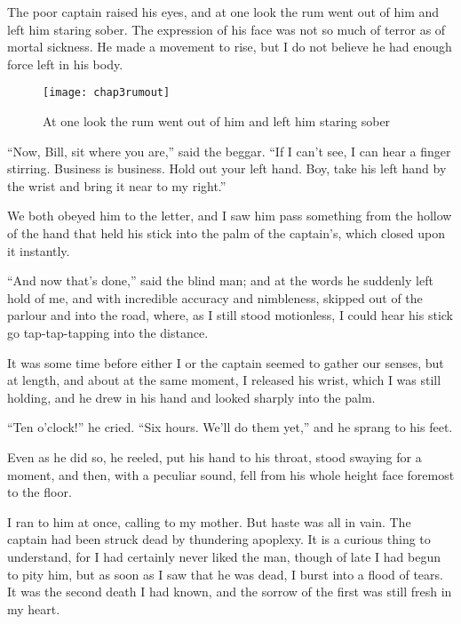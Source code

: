  

The poor captain raised his eyes, and at one look the rum went out of him and left him staring sober. The expression of his face was not so much of terror as of mortal sickness. He made a movement to rise, but I do not believe he had enough force left in his body.

\begin{sidewaysfigure}
\texttt{[image: chap3rumout]}%
\caption[The rum went out of him]{At one look the rum went out of him and left him staring sober}
\end{sidewaysfigure}

\enquote{Now, Bill, sit where you are,} said the beggar. \enquote{If I can’t see, I can hear a finger stirring. Business is business. Hold out your left hand. Boy, take his left hand by the wrist and bring it near to my right.}

We both obeyed him to the letter, and I saw him pass something from the hollow of the hand that held his stick into the palm of the captain’s, which closed upon it instantly.

\enquote{And now that’s done,} said the blind man; and at the words he suddenly left hold of me, and with incredible accuracy and nimbleness, skipped out of the parlour and into the road, where, as I still stood motionless, I could hear his stick go tap-tap-tapping into the distance.

It was some time before either I or the captain seemed to gather our senses, but at length, and about at the same moment, I released his wrist, which I was still holding, and he drew in his hand and looked sharply into the palm.

\enquote{Ten o’clock!} he cried. \enquote{Six hours. We’ll do them yet,} and he sprang to his feet.

Even as he did so, he reeled, put his hand to his throat, stood swaying for a moment, and then, with a peculiar sound, fell from his whole height face foremost to the floor.

I ran to him at once, calling to my mother. But haste was all in vain. The captain had been struck dead by thundering apoplexy. It is a curious thing to understand, for I had certainly never liked the man, though of late I had begun to pity him, but as soon as I saw that he was dead, I burst into a flood of tears. It was the second death I had known, and the sorrow of the first was still fresh in my heart.